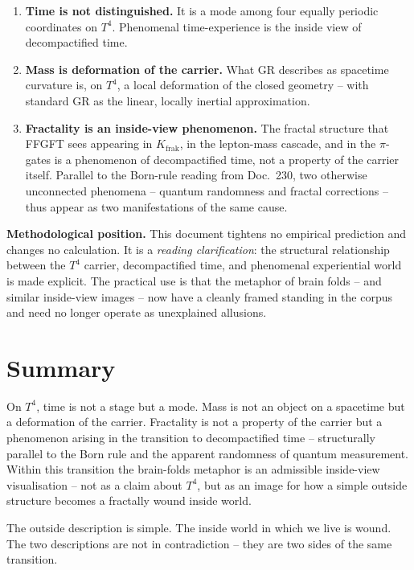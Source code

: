 \begin{enumerate}[leftmargin=2em,itemsep=4pt,topsep=4pt]
  \item \textbf{Time is not distinguished.} It is a mode among four
        equally periodic coordinates on $T^4$. Phenomenal
        time-experience is the inside view of decompactified time.

  \item \textbf{Mass is deformation of the carrier.} What GR
        describes as spacetime curvature is, on $T^4$, a local
        deformation of the closed geometry -- with standard GR as
        the linear, locally inertial approximation.

  \item \textbf{Fractality is an inside-view phenomenon.} The
        fractal structure that FFGFT sees appearing in
        $K_{\text{frak}}$, in the lepton-mass cascade, and in the
        $\pi$-gates is a phenomenon of decompactified time, not a
        property of the carrier itself. Parallel to the Born-rule
        reading from Doc.~230, two otherwise unconnected phenomena
        -- quantum randomness and fractal corrections -- thus
        appear as two manifestations of the same cause.
\end{enumerate}

\textbf{Methodological position.} This document tightens no
empirical prediction and changes no calculation. It is a
\emph{reading clarification}: the structural relationship between
the $T^4$ carrier, decompactified time, and phenomenal
experiential world is made explicit. The practical use is that the
metaphor of brain folds -- and similar inside-view images -- now
have a cleanly framed standing in the corpus and need no longer
operate as unexplained allusions.

\section{Summary}

On $T^4$, time is not a stage but a mode. Mass is not an object on
a spacetime but a deformation of the carrier. Fractality is not a
property of the carrier but a phenomenon arising in the transition
to decompactified time -- structurally parallel to the Born rule
and the apparent randomness of quantum measurement. Within this
transition the brain-folds metaphor is an admissible inside-view
visualisation -- not as a claim about $T^4$, but as an image for
how a simple outside structure becomes a fractally wound inside
world.

The outside description is simple. The inside world in which we
live is wound. The two descriptions are not in contradiction --
they are two sides of the same transition.

